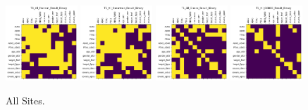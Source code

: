 \begin{figure}
    \includegraphics[width=0.24\textwidth]{chap6/figs/T1_All_Pearson_Result_Binary.png}
    \includegraphics[width=0.24\textwidth]{chap6/figs/T1_All_Spearman_Result_Binary.png}
    \includegraphics[width=0.24\textwidth]{chap6/figs/T1_All_Glasso_Result_Binary.png}
    \includegraphics[width=0.24\textwidth]{chap6/figs/T1_All_CODEC_Result_Binary.png}
    \caption{All Sites.}
    \label{fig:all}
\end{figure}

